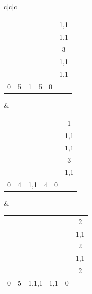 \documentclass[a4paper]{exam}
\begin{document}
\begin{questions}
\begin{parts}
\begin{solution}
    \begin{tabularx}{\linewidth}{c|c|c}
      \small
      \begin{tabular}{|*5{c|}c}
        \cline{1-5}
        & & & & & {\tiny 1,1}\\\cline{1-5}
        &  &  &  & & {\tiny 1,1}\\\cline{1-5}
        &  &  &  & & 3\\\cline{1-5}
        &  &  &  & & {\tiny 1,1}\\\cline{1-5}
        &  &  &  & & {\tiny 1,1}\\\cline{1-5}
        \multicolumn{1}{c}{0} & \multicolumn{1}{c}{5} & \multicolumn{1}{c}{1} & \multicolumn{1}{c}{5} & \multicolumn{1}{c}{0} & 
      \end{tabular}
      &
      \small
      \begin{tabular}{|*5{c|}c}
        \cline{1-5}
        &  &  &  & & 1\\\cline{1-5}
        & & & & & {\tiny 1,1}\\\cline{1-5}
        &  &  &  & & {\tiny 1,1}\\\cline{1-5}
        &  &  &  & & 3\\\cline{1-5}
        &  &  &  & & {\tiny 1,1}\\\cline{1-5}
        \multicolumn{1}{c}{0} & \multicolumn{1}{c}{4} & \multicolumn{1}{c}{\tiny 1,1} & \multicolumn{1}{c}{4} & \multicolumn{1}{c}{0} & 
      \end{tabular}
      &
      \small
      \begin{tabular}{|*5{c|}c}
        \cline{1-5}
        &  &  &  & & 2\\\cline{1-5}
        & & & & & {\tiny 1,1}\\\cline{1-5}
        &  &  &  & & 2\\\cline{1-5}
        &  &  &  & & {\tiny 1,1}\\\cline{1-5}
        &  &  &  & & 2\\\cline{1-5}
        \multicolumn{1}{c}{0} & \multicolumn{1}{c}{5} & \multicolumn{1}{c}{\tiny 1,1,1}  & \multicolumn{1}{c}{\tiny 1,1}  & \multicolumn{1}{c}{0} & 
      \end{tabular}  
    \end{tabularx}
    \bigskip


\end{solution}
\end{parts}
\end{questions}
\end{document}
